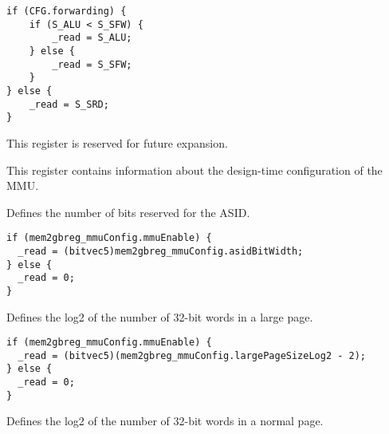 \reset{****}
\implementation{}
\begin{lstlisting}
if (CFG.forwarding) {
    if (S_ALU < S_SFW) {
        _read = S_ALU;
    } else {
        _read = S_SFW;
    }
} else {
    _read = S_SRD;
}
\end{lstlisting}


This register is reserved for future expansion.


This register contains information about the design-time configuration of the
MMU.

Defines the number of bits reserved for the ASID.

\reset{*****}
\implementation{}
\begin{lstlisting}
if (mem2gbreg_mmuConfig.mmuEnable) {
  _read = (bitvec5)mem2gbreg_mmuConfig.asidBitWidth;
} else {
  _read = 0;
}
\end{lstlisting}

Defines the log2 of the number of 32-bit words in a large page.

\reset{*****}
\implementation{}
\begin{lstlisting}
if (mem2gbreg_mmuConfig.mmuEnable) {
  _read = (bitvec5)(mem2gbreg_mmuConfig.largePageSizeLog2 - 2);
} else {
  _read = 0;
}
\end{lstlisting}

Defines the log2 of the number of 32-bit words in a normal page.

